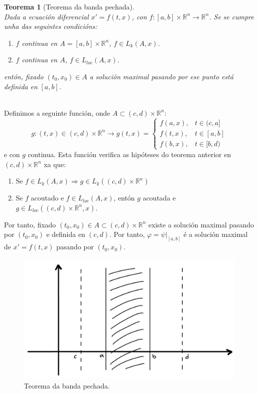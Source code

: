 \documentclass[11pt, a4paper,twoside]{article}
\makeatletter
\theoremstyle{theorem-style}  %
\newtheorem{theorem}{Teorema}[section]  %
\renewenvironment{proof}[1][\proofname]{\par
	\pushQED{\qed}%
	\normalfont \topsep6\p@\@plus6\p@\relax
	\list{}{%
		\settowidth{\leftmargin}{\quad:\hskip\labelsep}%
		\setlength{\labelwidth}{0pt}%
		\setlength{\itemindent}{-\leftmargin}%
	}%
	\item[\hskip\labelsep\itshape#1\@addpunct{:}]\ignorespaces
}{%
	\popQED\endlist\@endpefalse
}
\theoremstyle{definition-style}
\theoremstyle{example-style}
\makeatother
\begin{document}
\begin{theorem}[Teorema da banda pechada] \label{bandacerrada} \ \\
	Dada a ecuación diferencial $x' = f(t, x)$, con $f: [a, b] \times \mathbb{R}^n \longrightarrow \mathbb{R}^n$. Se se cumpre unha das seguintes condicións:
	\begin{enumerate}
		\item $f$ continua en $A = [a, b] \times \mathbb{R}^n$, $f \in L_k (A, x)$.
		\item $f$ continua en $A$, $f \in L_{loc} (A, x)$.
	\end{enumerate}
	entón, fixado $(t_0, x_0) \in A$ a solución maximal pasando por ese punto está definida en $[a, b]$. 
\end{theorem}
\begin{proof}\ \\
	Definimos a seguinte función, onde $A \subset (c, d) \times \mathbb{R}^n$:
	\[g: (t, x) \in (c, d) \times \mathbb{R}^n \longrightarrow g(t, x) = \begin{cases}
	f(a, x), &t \in (c, a] \\
	f(t, x), &t \in [a, b] \\
	f(b, x), &t \in [b, d)
	\end{cases}\]
	e con $g$ continua. Esta función verifica as hipóteses do teorema anterior en $(c, d) \times \mathbb{R}^n$ xa que:
	\begin{enumerate}[-]
		\item Se $f \in L_k(A, x) \Rightarrow g \in L_k ((c, d) \times \mathbb{R}^n)$
		\item Se $f$ acoutado e $f \in L_{loc} (A, x)$, entón $g$ acoutada e $g \in L_{loc} ((c, d) \times \mathbb{R}^n, x)$.
	\end{enumerate}
	Por tanto, fixado $(t_0, x_0) \in A \subset (c, d) \times \mathbb{R}^n$ existe a solución maximal pasando por $(t_0, x_0)$ e definida en $(c, d)$. Por tanto, $\varphi = \psi|_{[a, b]}$ é a solución maximal de $x' = f(t, x)$ pasando por $(t_0, x_0)$.
	
	\begin{figure}[h]
		\centering
		\includegraphics[scale=0.3]{banda_cerrada}
		\caption{Teorema da banda pechada.}
	\end{figure}
	\end{proof}
\end{document}
